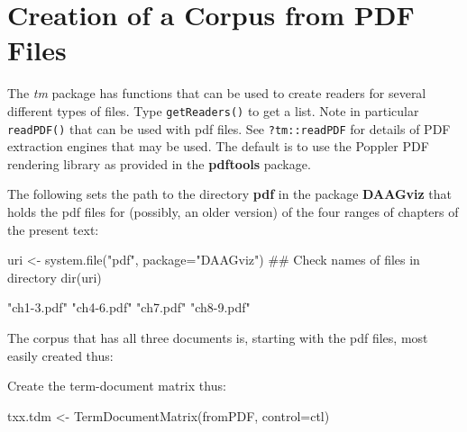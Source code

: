\documentclass{tufte-book}\usepackage[]{graphicx}\usepackage[]{color}
\newcommand{\txtt}[1]{\texttt{#1}}
\begin{document}
\section{Creation of a Corpus from PDF Files}

The {\em tm} package has functions that can be used to create readers
for several different types of files.  Type \txtt{getReaders()} to get
a list.  Note in particular \txtt{readPDF()} that can be used with pdf
files.  See \txtt{?tm::readPDF} for details of PDF extraction
engines that may be used.  The default is to use the Poppler PDF
rendering library as provided in the {\bf pdftools} package.

The following sets the path to the directory {\bf pdf} in the 
package {\bf DAAGviz} that holds the pdf files for (possibly,
an older version) of the four ranges of chapters of the present
text:
\begin{Schunk}
\begin{Sinput}
uri <- system.file("pdf", package="DAAGviz")
## Check names of files in directory
dir(uri)
\end{Sinput}
\begin{Soutput}
[1] "ch1-3.pdf" "ch4-6.pdf" "ch7.pdf"   "ch8-9.pdf"
\end{Soutput}
\end{Schunk}

The corpus that has all three documents is, starting with the
pdf files, most easily created thus:
\begin{fullwidth}
\begin{Schunk}
\end{Schunk}
\end{fullwidth}

Create the term-document matrix thus:
\begin{Schunk}
\begin{Sinput}
txx.tdm <- TermDocumentMatrix(fromPDF, control=ctl)
\end{Sinput}
\end{Schunk}
\end{document}
